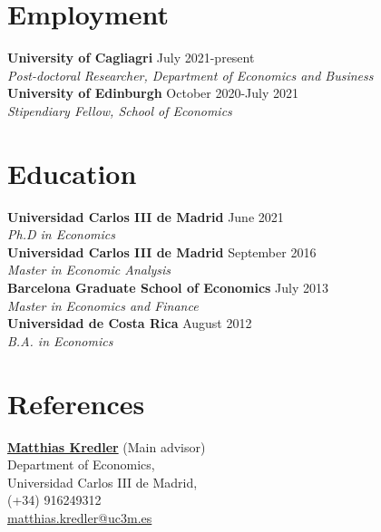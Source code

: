 \documentclass[margin]{res} %
\begin{document}
\begin{resume}

 
\section{Employment}
{\bf University of Cagliagri} \hfill July 2021-present  \\
{\sl Post-doctoral Researcher, Department of Economics and Business} \\
{\bf University of Edinburgh} \hfill October 2020-July 2021  \\
{\sl Stipendiary Fellow, School of Economics} 


\section{Education}
{\bf Universidad Carlos III de Madrid} \hfill June 2021  \\
{\sl Ph.D in Economics} \\
{\bf Universidad Carlos III de Madrid} \hfill September 2016 \\
{\sl Master in Economic Analysis} \\
{\bf Barcelona Graduate School of Economics} \hfill July 2013 \\
{\sl Master in Economics and Finance}  \\
{\bf Universidad de Costa Rica} \hfill August 2012 \\
{\sl B.A. in Economics}

\section{References}
\begin{multicols}{2}
	
	\href{http://www.eco.uc3m.es/~mkredler/}{\bf{Matthias Kredler}} (Main advisor)\\
	Department of Economics, \\
	Universidad Carlos III de Madrid, \\
	(+34) 916249312 \\
	\href{mailto:matthias.kredler@uc3m.es}{matthias.kredler@uc3m.es}
	

\end{multicols}
\end{resume}
\end{document}
